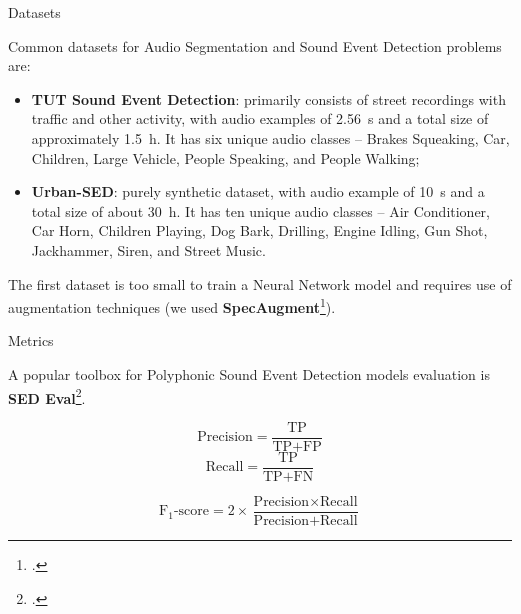 	\begin{frame}{Datasets}
	
		Common datasets for Audio Segmentation and Sound Event Detection problems are:
		
		\begin{itemize}
			\item \textbf{TUT Sound Event Detection}: primarily consists of street recordings with traffic and other activity, with audio examples of \SI{2.56}{\second} and a total size of approximately \SI{1.5}{\hour}. It has six unique audio classes -- Brakes Squeaking, Car, Children, Large Vehicle, People Speaking, and People Walking;
			\item \textbf{Urban-SED}: purely synthetic dataset, with audio example of \SI{10}{\second} and a total size of about \SI{30}{\hour}. It has ten unique audio classes -- Air Conditioner, Car Horn, Children Playing, Dog Bark, Drilling, Engine Idling, Gun Shot, Jackhammer, Siren, and Street Music.
		\end{itemize}
		
		The first dataset is too small to train a Neural Network model and requires use of augmentation techniques (we used \textbf{SpecAugment}\footcite{park19e_interspeech}).
	\end{frame}
	
	\begin{frame}{Metrics}
	
		A popular toolbox for Polyphonic Sound Event Detection models evaluation is \textbf{SED Eval}\footcite{app6060162}.
	
		\begin{multicols}{2}
  			\begin{equation*}
    			\text{Precision} = \frac{\text{TP}}{\text{TP} + \text{FP}}
  			\end{equation*}\break
  			\begin{equation*}
    			\text{Recall} = \frac{\text{TP}}{\text{TP} + \text{FN}}
  			\end{equation*}
		\end{multicols}

		$$
			\text{F$_{1}$-score} = 2 \times \frac{\text{Precision} \times \text{Recall}}{\text{Precision} + \text{Recall}}
		$$
	\end{frame}